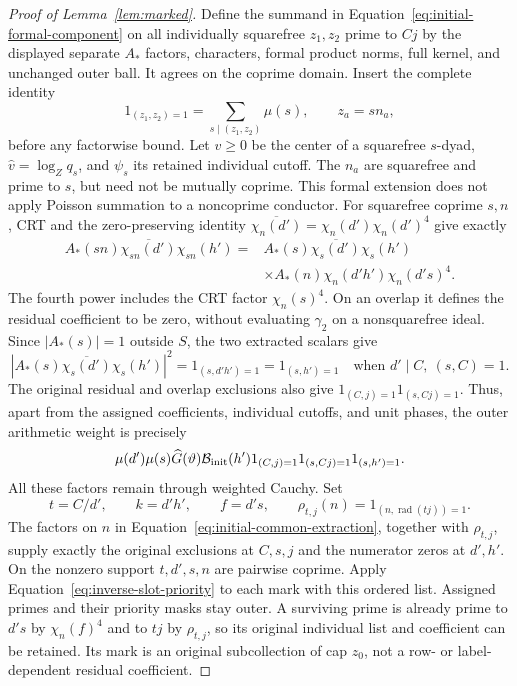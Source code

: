\documentclass[12pt]{article}
\begin{document}
\begin{proof}[Proof of Lemma~\ref{lem:marked}]
Define the summand in Equation~\eqref{eq:initial-formal-component}
on all individually squarefree \(z_1,z_2\) prime to \(Cj\) by the
displayed separate \(A_*\) factors, characters, formal product norms,
full kernel, and unchanged outer ball.  It agrees on the coprime
domain.  Insert the complete identity
\[
 1_{(z_1,z_2)=1}=\sum_{s\mid(z_1,z_2)}\mu(s),\qquad z_a=sn_a,
\]
before any factorwise bound.  Let \(v\ge0\) be the center of a
squarefree \(s\)-dyad, \(\widehat v=\log_Zq_s\), and \(\psi_s\)
its retained individual cutoff.  The \(n_a\) are squarefree and
prime to \(s\), but need not be mutually coprime.  This formal
extension does not apply Poisson summation to a noncoprime conductor.
For squarefree coprime \(s,n\), CRT and the zero-preserving identity
\(\overline{\chi_n(d')}=\chi_n(d')\chi_n(d')^4\) give exactly
\begin{equation}\label{eq:initial-common-extraction}
 \begin{split}
 A_*(sn)\overline{\chi_{sn}(d')}\chi_{sn}(h')
 ={}&A_*(s)\overline{\chi_s(d')}\chi_s(h')\\
 &\times A_*(n)\chi_n(d'h')\chi_n(d's)^4.
 \end{split}
\end{equation}
The fourth power includes the CRT factor \(\chi_n(s)^4\).
On an overlap it defines the residual coefficient to be zero, without
evaluating \(\gamma_2\) on a nonsquarefree ideal.  Since \(|A_*(s)|=1\)
outside \(S\), the two extracted scalars give
\[
 |A_*(s)\overline{\chi_s(d')}\chi_s(h')|^2
 =1_{(s,d'h')=1}=1_{(s,h')=1}
 \quad\text{when }d'\mid C,\ (s,C)=1.
\]
The original residual and overlap exclusions also give
\(1_{(C,j)=1}1_{(s,Cj)=1}\).  Thus, apart from the assigned
coefficients, individual cutoffs, and unit phases, the outer arithmetic
weight is precisely
\begin{equation}\label{eq:initial-outer-arithmetic}
 \mu(d')\mu(s)\widehat G(\vartheta)\mathcal B_{\rm init}(h')
 1_{(C,j)=1}1_{(s,Cj)=1}1_{(s,h')=1}.
\end{equation}
All these factors remain through weighted Cauchy.  Set
\[
 t=C/d',\qquad k=d'h',\qquad f=d's,\qquad
 \rho_{t,j}(n)=1_{(n,\operatorname{rad}(tj))=1}.
\]
The factors on \(n\) in Equation~\eqref{eq:initial-common-extraction},
together with \(\rho_{t,j}\), supply exactly the original exclusions
at \(C,s,j\) and the numerator zeros at \(d',h'\).  On the nonzero
support \(t,d',s,n\) are pairwise coprime.  Apply
Equation~\eqref{eq:inverse-slot-priority} to each mark with this
ordered list.  Assigned primes and their priority masks stay outer.
A surviving prime is already prime to \(d's\) by \(\chi_n(f)^4\)
and to \(tj\) by \(\rho_{t,j}\), so its original individual list and
coefficient can be retained.  Its mark is an original subcollection
of cap \(z_0\), not a row- or label-dependent residual coefficient.


\end{proof}
\end{document}
